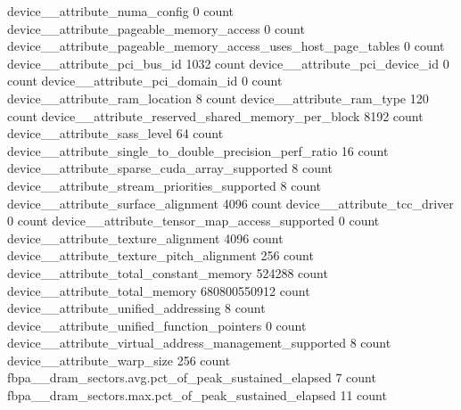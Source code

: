 device__attribute_numa_config                                                                  0 count
device__attribute_pageable_memory_access                                                       0 count
device__attribute_pageable_memory_access_uses_host_page_tables                                 0 count
device__attribute_pci_bus_id                                                                1032 count
device__attribute_pci_device_id                                                                0 count
device__attribute_pci_domain_id                                                                0 count
device__attribute_ram_location                                                                 8 count
device__attribute_ram_type                                                                   120 count
device__attribute_reserved_shared_memory_per_block                                          8192 count
device__attribute_sass_level                                                                  64 count
device__attribute_single_to_double_precision_perf_ratio                                       16 count
device__attribute_sparse_cuda_array_supported                                                  8 count
device__attribute_stream_priorities_supported                                                  8 count
device__attribute_surface_alignment                                                         4096 count
device__attribute_tcc_driver                                                                   0 count
device__attribute_tensor_map_access_supported                                                  0 count
device__attribute_texture_alignment                                                         4096 count
device__attribute_texture_pitch_alignment                                                    256 count
device__attribute_total_constant_memory                                                   524288 count
device__attribute_total_memory                                                      680800550912 count
device__attribute_unified_addressing                                                           8 count
device__attribute_unified_function_pointers                                                    0 count
device__attribute_virtual_address_management_supported                                         8 count
device__attribute_warp_size                                                                  256 count
fbpa__dram_sectors.avg.pct_of_peak_sustained_elapsed                                           7 count
fbpa__dram_sectors.max.pct_of_peak_sustained_elapsed                                          11 count

